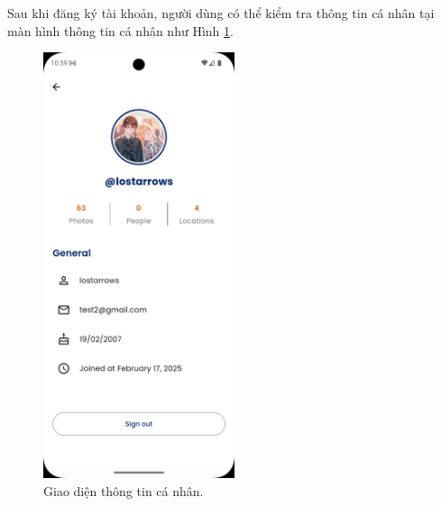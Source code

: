 Sau khi đăng ký tài khoản, người dùng có thể kiểm tra thông tin cá nhân tại màn hình thông tin cá nhân như Hình \ref{fig:profile-screen}. 

\begin{figure}[H]
    \centering  
    \includegraphics[width=0.5\textwidth]{figures/c4/4-2/profile.png}
    \caption{Giao diện thông tin cá nhân.}
    \label{fig:profile-screen}
\end{figure}
